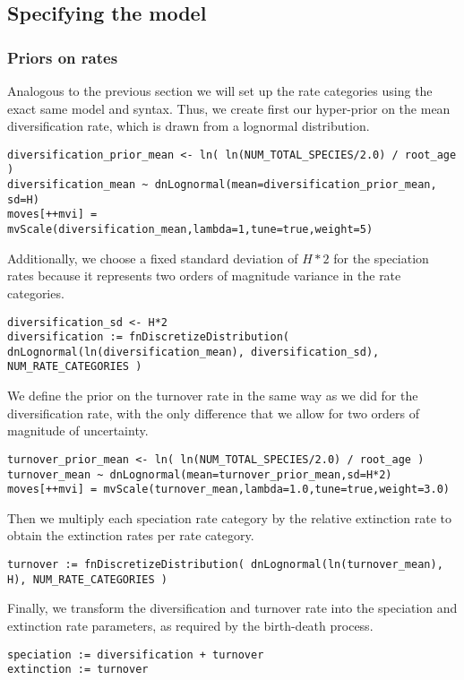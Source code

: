 \subsection{Specifying the model}

\subsubsection{Priors on rates}
Analogous to the previous section we will set up the rate categories using the exact same model and \Rev syntax.
Thus, we create first our hyper-prior on the mean diversification rate, which is drawn from a lognormal distribution.
{\tt \begin{snugshade*}
\begin{lstlisting}
diversification_prior_mean <- ln( ln(NUM_TOTAL_SPECIES/2.0) / root_age )
diversification_mean ~ dnLognormal(mean=diversification_prior_mean, sd=H)
moves[++mvi] = mvScale(diversification_mean,lambda=1,tune=true,weight=5)
\end{lstlisting}
\end{snugshade*}}
Additionally, we choose a fixed standard deviation of $H*2$ for the speciation rates because it represents two orders of magnitude variance in the rate categories.
{\tt \begin{snugshade*}
\begin{lstlisting}
diversification_sd <- H*2
diversification := fnDiscretizeDistribution( dnLognormal(ln(diversification_mean), diversification_sd), NUM_RATE_CATEGORIES )
\end{lstlisting}
\end{snugshade*}}
We define the prior on the turnover rate in the same way as we did for the diversification rate, with the only difference that we allow for two orders of magnitude of uncertainty.
{\tt \begin{snugshade*}
\begin{lstlisting}
turnover_prior_mean <- ln( ln(NUM_TOTAL_SPECIES/2.0) / root_age )
turnover_mean ~ dnLognormal(mean=turnover_prior_mean,sd=H*2) 
moves[++mvi] = mvScale(turnover_mean,lambda=1.0,tune=true,weight=3.0)
\end{lstlisting}
\end{snugshade*}}
Then we multiply each speciation rate category by the relative extinction rate to obtain the extinction rates per rate category.
{\tt \begin{snugshade*}
\begin{lstlisting}
turnover := fnDiscretizeDistribution( dnLognormal(ln(turnover_mean), H), NUM_RATE_CATEGORIES )
\end{lstlisting}
\end{snugshade*}}
Finally, we transform the diversification and turnover rate into the speciation and extinction rate parameters, as required by the birth-death process.
{\tt \begin{snugshade*}
\begin{lstlisting}
speciation := diversification + turnover
extinction := turnover 
\end{lstlisting}
\end{snugshade*}}


